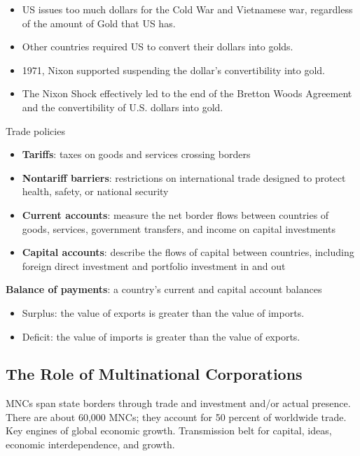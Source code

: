 \documentclass[
]{book}
\begin{document}
\begin{itemize}
  \begin{itemize}
  \item
    US issues too much dollars for the Cold War and Vietnamese war, regardless of the amount of Gold that US has.
  \item
    Other countries required US to convert their dollars into golds.
  \item
    1971, Nixon supported suspending the dollar's convertibility into gold.
  \item
    The Nixon Shock effectively led to the end of the Bretton Woods Agreement and the convertibility of U.S. dollars into gold.
  \end{itemize}
\end{itemize}

Trade policies

\begin{itemize}
\item
  \textbf{Tariffs}: taxes on goods and services crossing borders
\item
  \textbf{Nontariff barriers}: restrictions on international trade designed to protect health, safety, or national security
\item
  \textbf{Current accounts}: measure the net border flows between countries of goods, services, government transfers, and income on capital investments
\item
  \textbf{Capital accounts}: describe the flows of capital between countries, including foreign direct investment and portfolio investment in and out
\end{itemize}

\textbf{Balance of payments}: a country's current and capital account balances

\begin{itemize}
\item
  Surplus: the value of exports is greater than the value of imports.
\item
  Deficit: the value of imports is greater than the value of exports.
\end{itemize}

\hypertarget{the-role-of-multinational-corporations}{%
\subsection{The Role of Multinational Corporations}\label{the-role-of-multinational-corporations}}

MNCs span state borders through trade and investment and/or actual presence. There are about 60,000 MNCs; they account for 50 percent of worldwide trade. Key engines of global economic growth. Transmission belt for capital, ideas, economic interdependence, and growth.
\end{document}
